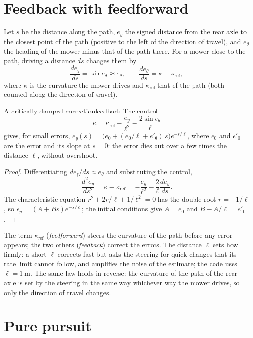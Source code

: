 \section{Feedback with feedforward}

Let $s$ be the distance along the path, $e_y$ the signed distance from the
rear axle to the closest point of the path (positive to the left of the
direction of travel), and $e_\theta$ the heading of the mower minus that of
the path there. For a mower close to the path, driving a distance $ds$
changes them by
\[
  \frac{de_y}{ds} = \sin e_\theta \approx e_\theta, \qquad
  \frac{de_\theta}{ds} = \kappa - \kappa_{\mathrm{ref}},
\]
where $\kappa$ is the curvature the mower drives and
$\kappa_{\mathrm{ref}}$ that of the path (both counted along the direction
of travel).

\begin{proposition}{A critically damped correction}{feedback}
  The control
  \[
    \kappa = \kappa_{\mathrm{ref}} - \frac{e_y}{\ell^2}
      - \frac{2 \sin e_\theta}{\ell}
  \]
  gives, for small errors, $e_y(s) = \bigl(e_0 + (e_0/\ell + e'_0)\,s\bigr)
  e^{-s/\ell}$, where $e_0$ and $e'_0$ are the error and its slope at $s =
  0$: the error dies out over a few times the distance $\ell$, without
  overshoot.
\end{proposition}

\begin{proof}
  Differentiating $de_y/ds \approx e_\theta$ and substituting the control,
  \[
    \frac{d^2 e_y}{ds^2} = \kappa - \kappa_{\mathrm{ref}}
    = -\frac{e_y}{\ell^2} - \frac{2}{\ell}\frac{de_y}{ds}.
  \]
  The characteristic equation $r^2 + 2r/\ell + 1/\ell^2 = 0$ has the double
  root $r = -1/\ell$, so $e_y = (A + Bs)e^{-s/\ell}$; the initial
  conditions give $A = e_0$ and $B - A/\ell = e'_0$.
\end{proof}

The term $\kappa_{\mathrm{ref}}$ (\emph{feedforward}) steers the curvature
of the path before any error appears; the two others (\emph{feedback})
correct the errors. The distance $\ell$ sets how firmly: a short $\ell$
corrects fast but asks the steering for quick changes that its rate limit
cannot follow, and amplifies the noise of the estimate; the code uses
$\ell = \SI{1}{\metre}$. The same law holds in reverse: the curvature of the
path of the rear axle is set by the steering in the same way whichever way
the mower drives, so only the direction of travel changes.

\section{Pure pursuit}

